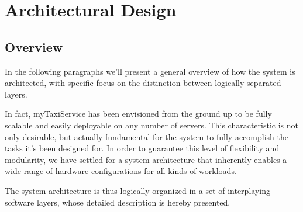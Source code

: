 \chapter{Architectural Design}
  
\section{Overview}
In the following paragraphs we'll present a general overview of how the system is architected, with specific focus on the distinction between logically separated layers.

In fact, myTaxiService has been envisioned from the ground up to be fully scalable and easily deployable on any number of servers. This characteristic is not only desirable, but actually fundamental for the system to fully accomplish the tasks it's been designed for. In order to guarantee this level of flexibility and modularity, we have settled for a system architecture that inherently enables a wide range of hardware configurations for all kinds of workloads.

The system architecture is thus logically organized in a set of interplaying software layers, whose detailed description is hereby presented.

